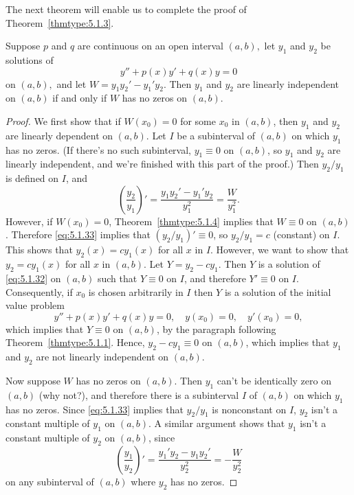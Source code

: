 \documentclass{ximera}
\begin{document}
The next theorem will enable us to complete the proof of
Theorem~\ref{thmtype:5.1.3}.

\begin{theorem}\label{thmtype:5.1.5}
 Suppose  $p$ and $q$ are continuous on an open interval $(a,b),$
 let $y_1$ and $y_2$ be solutions of
\begin{equation}\label{eq:5.1.32}
y''+p(x)y'+q(x)y=0
\end{equation}
on  $(a,b),$ and let $W=y_1y_2'-y_1'y_2.$
Then $y_1$ and $y_2$ are linearly independent on  $(a,b)$ if and only
if $W$ has no zeros on  $(a,b).$
\end{theorem}

\begin{proof}
We first show that if $W(x_0)=0$ for some $x_0$ in  $(a,b)$, then
$y_1$ and $y_2$ are linearly dependent on  $(a,b)$.  Let $I$ be a
subinterval
of  $(a,b)$ on which $y_1$ has no zeros. (If there's no such
subinterval, $y_1\equiv0$ on  $(a,b)$, so $y_1$ and $y_2$
are linearly independent, and we're finished with this part of the
proof.) Then $y_2/y_1$ is defined on $I$, and
\begin{equation}\label{eq:5.1.33}
\left(\frac{y_2}{y_1}\right)'=\frac{y_1y_2'-y_1'y_2}{y_1^2}=\frac{W}{y_1^2}.
\end{equation}
However, if $W(x_0)=0$,
 Theorem~\ref{thmtype:5.1.4} implies that $W\equiv0$ on  $(a,b)$.
Therefore \eqref{eq:5.1.33} implies that  $(y_2/y_1)'\equiv0$, so
$y_2/y_1=c$ (constant) on $I$. This shows that $y_2(x)=cy_1(x)$
for all $x$ in $I$. However, we want to show that $y_2=cy_1(x)$
for all $x$ in  $(a,b)$.
Let $Y=y_2-cy_1$. Then $Y$ is a solution of \eqref{eq:5.1.32}
on  $(a,b)$ such that $Y\equiv0$ on $I$, and therefore $Y'\equiv0$ on
$I$. Consequently, if $x_0$  is chosen arbitrarily in  $I$ then
$Y$ is a solution of the initial value problem
$$
y''+p(x)y'+q(x)y=0,\quad y(x_0)=0,\quad y'(x_0)=0,
$$
which implies that $Y\equiv0$ on  $(a,b)$,
by the paragraph following
Theorem~\ref{thmtype:5.1.1}. %
 Hence, $y_2-cy_1\equiv0$
on  $(a,b)$, which implies that $y_1$ and $y_2$ are not linearly
independent on  $(a,b)$.

Now suppose   $W$ has no zeros on  $(a,b)$.  Then $y_1$
can't be identically zero on  $(a,b)$ (why not?), and therefore there
is a subinterval $I$ of  $(a,b)$ on which $y_1$ has no zeros. Since
\eqref{eq:5.1.33} implies that $y_2/y_1$ is nonconstant on $I$,
$y_2$ isn't  a constant multiple of $y_1$ on  $(a,b)$.
A similar argument shows that $y_1$ isn't  a constant multiple of
$y_2$ on  $(a,b)$, since
$$
\left(\frac{y_1}{y_2}\right)'=\frac{y_1'y_2-y_1y_2'}{y_2^2}=-\frac{W}{y_2^2}
$$
on any subinterval of  $(a,b)$ where $y_2$ has no zeros.
\end{proof}
\end{document}
